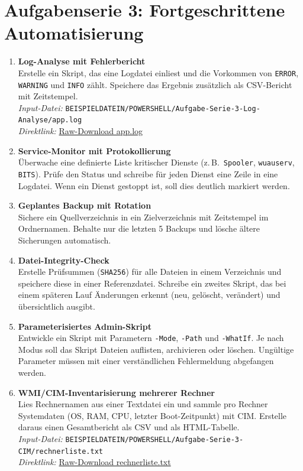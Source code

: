 \documentclass[11pt, oneside, numbers=noenddot]{scrbook}
\begin{document}
\chapter{Aufgabenserie 3: Fortgeschrittene Automatisierung}
\begin{enumerate}
\item \textbf{Log-Analyse mit Fehlerbericht}\\
Erstelle ein Skript, das eine Logdatei einliest und die Vorkommen von \texttt{ERROR}, \texttt{WARNING} und \texttt{INFO} zählt. Speichere das Ergebnis zusätzlich als CSV-Bericht mit Zeitstempel.\\
\textit{Input-Datei:} \texttt{BEISPIELDATEIN/POWERSHELL/Aufgabe-Serie-3-Log-Analyse/app.log}\\
\textit{Direktlink:} \href{https://raw.githubusercontent.com/michelroegl-brunner/HTL-Braunau/main/BEISPIELDATEIN/POWERSHELL/Aufgabe-Serie-3-Log-Analyse/app.log}{Raw-Download app.log}

\item \textbf{Service-Monitor mit Protokollierung}\\
Überwache eine definierte Liste kritischer Dienste (z.\,B.\ \texttt{Spooler}, \texttt{wuauserv}, \texttt{BITS}). Prüfe den Status und schreibe für jeden Dienst eine Zeile in eine Logdatei. Wenn ein Dienst gestoppt ist, soll dies deutlich markiert werden.

\item \textbf{Geplantes Backup mit Rotation}\\
Sichere ein Quellverzeichnis in ein Zielverzeichnis mit Zeitstempel im Ordnernamen. Behalte nur die letzten 5 Backups und lösche ältere Sicherungen automatisch.

\item \textbf{Datei-Integrity-Check}\\
Erstelle Prüfsummen (\texttt{SHA256}) für alle Dateien in einem Verzeichnis und speichere diese in einer Referenzdatei. Schreibe ein zweites Skript, das bei einem späteren Lauf Änderungen erkennt (neu, gelöscht, verändert) und übersichtlich ausgibt.

\item \textbf{Parameterisiertes Admin-Skript}\\
Entwickle ein Skript mit Parametern \texttt{-Mode}, \texttt{-Path} und \texttt{-WhatIf}. Je nach Modus soll das Skript Dateien auflisten, archivieren oder löschen. Ungültige Parameter müssen mit einer verständlichen Fehlermeldung abgefangen werden.

\item \textbf{WMI/CIM-Inventarisierung mehrerer Rechner}\\
Lies Rechnernamen aus einer Textdatei ein und sammle pro Rechner Systemdaten (OS, RAM, CPU, letzter Boot-Zeitpunkt) mit CIM. Erstelle daraus einen Gesamtbericht als CSV und als HTML-Tabelle.\\
\textit{Input-Datei:} \texttt{BEISPIELDATEIN/POWERSHELL/Aufgabe-Serie-3-CIM/rechnerliste.txt}\\
\textit{Direktlink:} \href{https://raw.githubusercontent.com/michelroegl-brunner/HTL-Braunau/main/BEISPIELDATEIN/POWERSHELL/Aufgabe-Serie-3-CIM/rechnerliste.txt}{Raw-Download rechnerliste.txt}
\end{enumerate}
\end{document}
